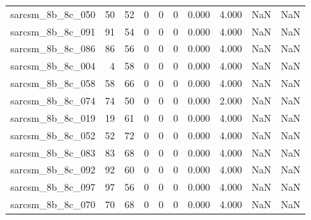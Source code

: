 \documentclass{article}
\begin{document}
\begin{longtable}{lrrrrrrrrr}
sarcsm\_8b\_8c\_050 & 50 & 52 & 0 & 0 & 0 & 0.000 & 4.000 & NaN & NaN \\
sarcsm\_8b\_8c\_091 & 91 & 54 & 0 & 0 & 0 & 0.000 & 4.000 & NaN & NaN \\
sarcsm\_8b\_8c\_086 & 86 & 56 & 0 & 0 & 0 & 0.000 & 4.000 & NaN & NaN \\
sarcsm\_8b\_8c\_004 & 4 & 58 & 0 & 0 & 0 & 0.000 & 4.000 & NaN & NaN \\
sarcsm\_8b\_8c\_058 & 58 & 66 & 0 & 0 & 0 & 0.000 & 4.000 & NaN & NaN \\
sarcsm\_8b\_8c\_074 & 74 & 50 & 0 & 0 & 0 & 0.000 & 2.000 & NaN & NaN \\
sarcsm\_8b\_8c\_019 & 19 & 61 & 0 & 0 & 0 & 0.000 & 4.000 & NaN & NaN \\
sarcsm\_8b\_8c\_052 & 52 & 72 & 0 & 0 & 0 & 0.000 & 4.000 & NaN & NaN \\
sarcsm\_8b\_8c\_083 & 83 & 68 & 0 & 0 & 0 & 0.000 & 4.000 & NaN & NaN \\
sarcsm\_8b\_8c\_092 & 92 & 60 & 0 & 0 & 0 & 0.000 & 4.000 & NaN & NaN \\
sarcsm\_8b\_8c\_097 & 97 & 56 & 0 & 0 & 0 & 0.000 & 4.000 & NaN & NaN \\
sarcsm\_8b\_8c\_070 & 70 & 68 & 0 & 0 & 0 & 0.000 & 4.000 & NaN & NaN \\
\end{longtable}
\end{document}
